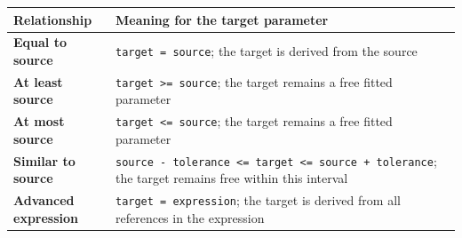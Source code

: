 \documentclass[
  10pt,
  a4paper,
  oneside]{scrreprt}
\begin{document}
\begin{longtable}[]{@{}ll@{}}
\toprule
\begin{minipage}[b]{0.47\columnwidth}\raggedright
Relationship\strut
\end{minipage} & \begin{minipage}[b]{0.47\columnwidth}\raggedright
Meaning for the target parameter\strut
\end{minipage}\tabularnewline
\midrule
\endhead
\begin{minipage}[t]{0.47\columnwidth}\raggedright
\textbf{Equal to source}\strut
\end{minipage} & \begin{minipage}[t]{0.47\columnwidth}\raggedright
\texttt{target\ =\ source}; the target is derived from the source\strut
\end{minipage}\tabularnewline
\begin{minipage}[t]{0.47\columnwidth}\raggedright
\textbf{At least source}\strut
\end{minipage} & \begin{minipage}[t]{0.47\columnwidth}\raggedright
\texttt{target\ \textgreater{}=\ source}; the target remains a free
fitted parameter\strut
\end{minipage}\tabularnewline
\begin{minipage}[t]{0.47\columnwidth}\raggedright
\textbf{At most source}\strut
\end{minipage} & \begin{minipage}[t]{0.47\columnwidth}\raggedright
\texttt{target\ \textless{}=\ source}; the target remains a free fitted
parameter\strut
\end{minipage}\tabularnewline
\begin{minipage}[t]{0.47\columnwidth}\raggedright
\textbf{Similar to source}\strut
\end{minipage} & \begin{minipage}[t]{0.47\columnwidth}\raggedright
\texttt{source\ -\ tolerance\ \textless{}=\ target\ \textless{}=\ source\ +\ tolerance};
the target remains free within this interval\strut
\end{minipage}\tabularnewline
\begin{minipage}[t]{0.47\columnwidth}\raggedright
\textbf{Advanced expression}\strut
\end{minipage} & \begin{minipage}[t]{0.47\columnwidth}\raggedright
\texttt{target\ =\ expression}; the target is derived from all
references in the expression\strut
\end{minipage}\tabularnewline
\bottomrule
\end{longtable}
\end{document}
